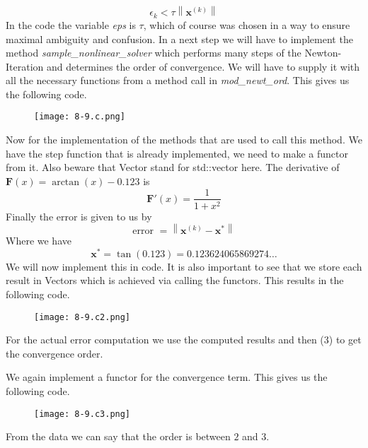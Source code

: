 \documentclass{article}
\newcommand\xk{\mathbf{x}^{\left(k\right)}}
\begin{document}
\begin{equation*}
    \epsilon_{k} < \tau \left\lVert \xk\right\rVert
\end{equation*}
In the code the variable \textit{eps} is $\tau$, which of course was chosen in a way to ensure maximal ambiguity and confusion. In a next step we will have to implement the method \textit{sample\_nonlinear\_solver} which performs many steps of the Newton-Iteration and determines the order of convergence. We will have to supply it with all the necessary functions from a method call in \textit{mod\_newt\_ord}. This gives us the following code.

\begin{figure}[!hbt]
    \centering
    \texttt{[image: 8-9.c.png]}
\end{figure}
Now for the implementation of the methods that are used to call this method. We have the step function that is already implemented, we need to make a functor from it. Also beware that Vector stand for std::vector here. The derivative of $\mathbf{F}\left(x\right) = \arctan\left(x\right) -0.123$ is
\begin{equation*}
    \mathbf{F}'\left(x\right) = \frac{1}{1+x^{2}}
\end{equation*}
Finally the error is given to us by
\begin{equation*}
    \text{error } = \left\lVert \xk - \mathbf{x}^{*}\right\rVert
\end{equation*}
Where we have 
\begin{equation*}
    \mathbf{x}^{*} = \tan\left(0.123\right) = 0.123624065869274\dots
\end{equation*}
We will now implement this in code. It is also important to see that we store each result in Vectors which is achieved via calling the functors. This results in the following code.
\begin{figure}[!hbt]
    \centering
    \texttt{[image: 8-9.c2.png]}
\end{figure}

For the actual error computation we use the computed results and then (3) to get the convergence order. 

\pagebreak

We again implement a functor for the convergence term. This gives us the following code.

\begin{figure}[!hbt]
    \centering
    \texttt{[image: 8-9.c3.png]}
\end{figure}
From the data we can say that the order is between $2$ and $3$.
\end{document}
